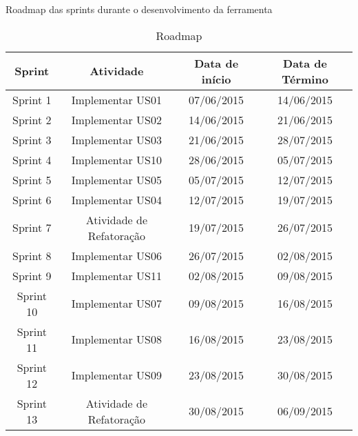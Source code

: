 \begin{frame}{Roadmap das sprints durante o desenvolvimento da ferramenta}

\begin{table}[]
\centering
\small
\caption{Roadmap}
\label{cronograma_sprints}
\begin{tabular}{|c|c|c|c|}
\hline
\textbf{Sprint}	& \textbf{Atividade} & \textbf{Data de início} & \textbf{Data de Término}	\\ \hline
Sprint 1  & Implementar US01 			& 07/06/2015     	& 14/06/2015      	\\ \hline
Sprint 2  & Implementar US02 			& 14/06/2015     	& 21/06/2015      	\\ \hline
Sprint 3  & Implementar US03 			& 21/06/2015     	& 28/07/2015      	\\ \hline
Sprint 4  & Implementar US10 			& 28/06/2015     	& 05/07/2015      	\\ \hline
Sprint 5  & Implementar US05 			& 05/07/2015     	& 12/07/2015      	\\ \hline
Sprint 6  & Implementar US04 			& 12/07/2015    	 	& 19/07/2015      	\\ \hline
Sprint 7  & Atividade de Refatoração		& 19/07/2015	 		& 26/07/2015	   		\\ \hline
Sprint 8  & Implementar US06 			& 26/07/2015     	& 02/08/2015      	\\ \hline
Sprint 9  & Implementar US11 			& 02/08/2015     	& 09/08/2015      	\\ \hline
Sprint 10 & Implementar US07 			& 09/08/2015     	& 16/08/2015      	\\ \hline
Sprint 11 & Implementar US08 			& 16/08/2015     	& 23/08/2015      	\\ \hline
Sprint 12 & Implementar US09 			& 23/08/2015     	& 30/08/2015      	\\ \hline
Sprint 13 & Atividade de Refatoração		& 30/08/2015     	& 06/09/2015	   		\\ \hline
\end{tabular}
\end{table}
\end{frame}

